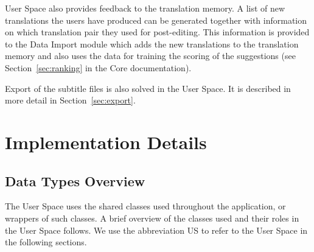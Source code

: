 User Space also provides feedback to the translation memory. A list of new translations the users have produced can be generated together with information on which translation pair they used for post-editing. This information is provided to the Data Import module which adds the new translations to the translation memory and also uses the data for training the scoring of the suggestions (see Section~\ref{sec:ranking} in the Core documentation).

Export of the subtitle files is also solved in the User Space. It is described in more detail in Section~\ref{sec:export}.

\section{Implementation Details}
\subsection{Data Types Overview}

The User Space uses the shared classes used throughout the application, or wrappers of such classes. A brief overview of the classes used and their roles in the User Space follows. We use the abbreviation US to refer to the User Space in the following sections.

